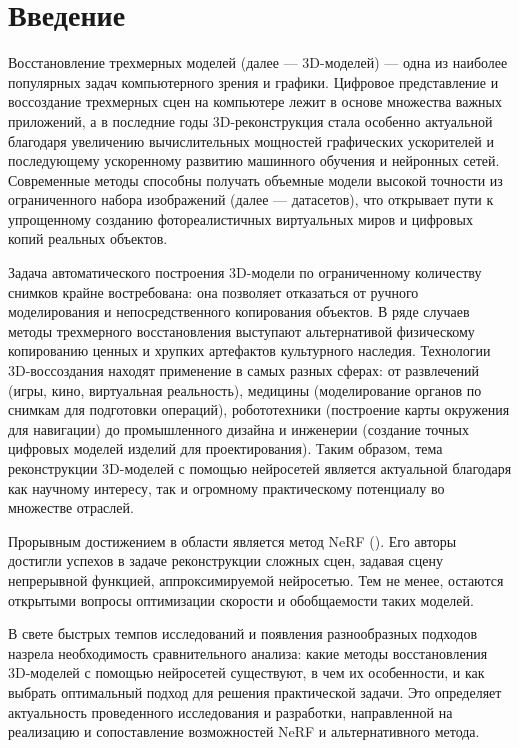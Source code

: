 \chapter{Введение}

Восстановление трехмерных моделей (далее — 3D-моделей) — одна из наиболее
популярных задач компьютерного зрения и графики. Цифровое представление и
воссоздание трехмерных сцен на компьютере лежит в основе множества важных
приложений, а в последние годы 3D-реконструкция стала особенно актуальной
благодаря увеличению вычислительных мощностей графических ускорителей и
последующему ускоренному развитию машинного обучения и нейронных сетей.
Современные методы способны получать объемные модели высокой точности из
ограниченного набора изображений (далее — датасетов), что открывает пути к
упрощенному созданию фотореалистичных виртуальных миров и цифровых копий
реальных объектов.

Задача автоматического построения 3D-модели по ограниченному количеству снимков
крайне востребована: она позволяет отказаться от ручного моделирования и
непосредственного копирования объектов.  В ряде случаев методы трехмерного
восстановления выступают альтернативой физическому копированию ценных и хрупких
артефактов культурного наследия. Технологии 3D-воссоздания находят применение в
самых разных сферах: от развлечений (игры, кино, виртуальная реальность),
медицины (моделирование органов по снимкам для подготовки операций),
робототехники (построение карты окружения для навигации) до промышленного
дизайна и инженерии (создание точных цифровых моделей изделий для
проектирования). Таким образом, тема реконструкции 3D-моделей с помощью
нейросетей является актуальной благодаря как научному интересу, так и огромному
практическому потенциалу во множестве отраслей.

Прорывным достижением в области является метод NeRF
(\cite{mildenhall2020nerf}). Его авторы достигли успехов в задаче
реконструкции сложных сцен, задавая сцену непрерывной функцией,
аппроксимируемой нейросетью. %
Тем не менее, остаются открытыми вопросы оптимизации скорости и обобщаемости таких моделей.

В свете быстрых темпов исследований и появления разнообразных подходов назрела
необходимость сравнительного анализа: какие методы восстановления 3D-моделей с
помощью нейросетей существуют, в чем их особенности, и как выбрать оптимальный
подход для решения практической задачи. Это определяет актуальность проведенного
исследования и разработки, направленной на реализацию и сопоставление
возможностей NeRF и альтернативного метода.

